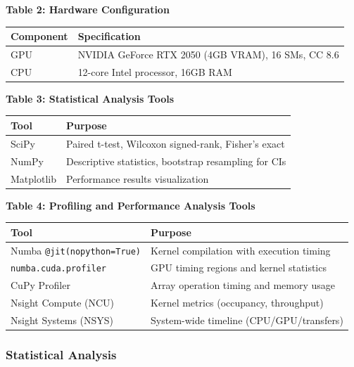 \documentclass[a4paper,14pt]{extarticle}
\begin{document}
\begin{center}
\textbf{Table 2: Hardware Configuration}\\[0.5em]
\begin{tabular}{@{}ll@{}}
\toprule
\textbf{Component} & \textbf{Specification} \\
\midrule
GPU & NVIDIA GeForce RTX 2050 (4GB VRAM), 16 SMs, CC 8.6 \\
CPU & 12-core Intel processor, 16GB RAM \\
\bottomrule
\end{tabular}
\end{center}

\begin{center}
\textbf{Table 3: Statistical Analysis Tools}\\[0.5em]
\small
\begin{tabular}{@{}ll@{}}
\toprule
\textbf{Tool} & \textbf{Purpose} \\
\midrule
SciPy & Paired t-test, Wilcoxon signed-rank, Fisher's exact \\
NumPy & Descriptive statistics, bootstrap resampling for CIs \\
Matplotlib & Performance results visualization \\
\bottomrule
\end{tabular}
\end{center}

\begin{center}
\textbf{Table 4: Profiling and Performance Analysis Tools}\\[0.5em]
\small
\begin{tabular}{@{}ll@{}}
\toprule
\textbf{Tool} & \textbf{Purpose} \\
\midrule
Numba \texttt{@jit(nopython=True)} & Kernel compilation with execution timing \\
\texttt{numba.cuda.profiler} & GPU timing regions and kernel statistics \\
CuPy Profiler & Array operation timing and memory usage \\
Nsight Compute (NCU) & Kernel metrics (occupancy, throughput) \\
Nsight Systems (NSYS) & System-wide timeline (CPU/GPU/transfers) \\
\bottomrule
\end{tabular}
\end{center}


\subsubsection*{Statistical Analysis}
\end{document}
